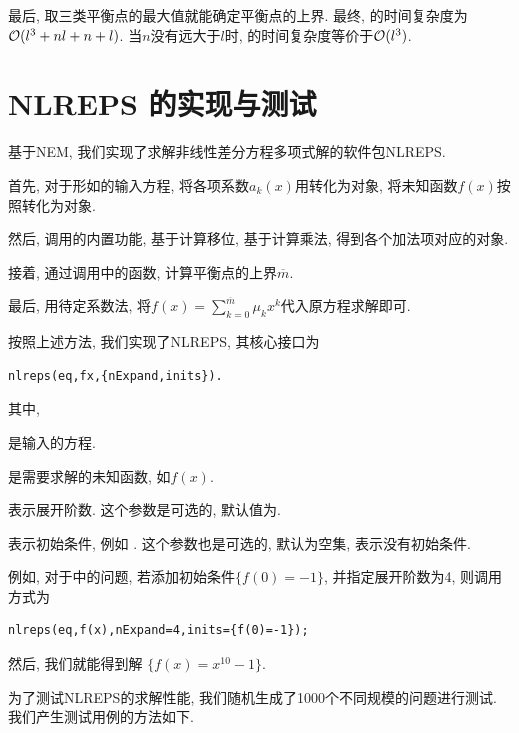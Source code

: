 最后, 取三类平衡点的最大值就能确定平衡点的上界. 最终, 的时间复杂度为$\mathcal O(l^3+nl+n+l)$. 当$n$没有远大于$l$时, 的时间复杂度等价于$\mathcal O(l^3)$.

\section{NLREPS 的实现与测试}\label{ch4sec4}

基于NEM, 我们实现了求解非线性差分方程多项式解的软件包NLREPS.
\begin{compactenum}[(1)]
\item 首先, 对于形如的输入方程, 将各项系数$a_k(x)$用转化为对象, 将未知函数$f(x)$按照转化为对象. 
\item 然后, 调用的内置功能, 基于计算移位, 基于计算乘法, 得到各个加法项对应的对象. 
\item 接着, 通过调用中的函数, 计算平衡点的上界$\overline{m}$.
\item 最后, 用待定系数法, 将$f(x)=\sum_{k=0}^{\overline{m}}{\mu_k x^k}$代入原方程求解即可. 
\end{compactenum}

按照上述方法, 我们实现了NLREPS, 其核心接口为
\begin{verbatim}
nlreps(eq,fx,{nExpand,inits}).
\end{verbatim}
其中,
\begin{compactitem}[\textbullet]
\item {} 是输入的方程.
\item {} 是需要求解的未知函数, 如$f(x)$.
\item {} 表示展开阶数. 这个参数是可选的, 默认值为. 
\item {} 表示初始条件, 例如 . 这个参数也是可选的, 默认为空集, 表示没有初始条件. 
\end{compactitem}

例如, 对于中的问题, 若添加初始条件$\{f(0)=-1\}$, 并指定展开阶数为4, 则调用方式为
\begin{verbatim}
nlreps(eq,f(x),nExpand=4,inits={f(0)=-1});
\end{verbatim}
然后, 我们就能得到解 $\{f(x)=x^{10}-1\}$.

为了测试NLREPS的求解性能, 我们随机生成了1000个不同规模的问题进行测试. 我们产生测试用例的方法如下.

